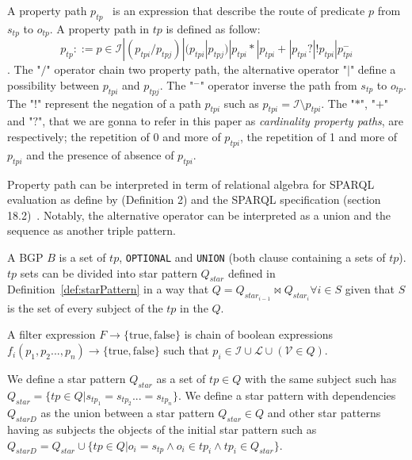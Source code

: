 \begin{definition}\label{def:propertyPath}
   A property path $p_{tp}$~\cite{Kostylev2015} is an expression that describe the route of predicate $p$ from $s_{tp}$ to $o_{tp}$.
   A property path in $tp$ is defined as follow:
   \begin{equation}
    p_{tp} ::= p \in \mathcal{I} | (p_{tpi}/p_{tpj}) | (p_{tpi}|p_{tpj}) | p_{tpi}* | p_{tpi}+ | p_{tpi}? | !p_{tpi}| p_{tpi}^{-}
   \end{equation}.
   The "$/$" operator chain two property path, the alternative operator "$|$" define a possibility between $p_{tpi}$ and $p_{tpj}$.
   The "$^-$" operator inverse the path from $s_{tp}$ to $o_{tp}$.
   The "$!$" represent the negation of a path $p_{tpi}$ such as $p_{tpi} = \mathcal{I} \setminus p_{tpi}$.
   The "$*$", "$+$" and "$?$", that we are gonna to refer in this paper as \emph{cardinality property paths}, are respectively; the repetition of 0 and more of $p_{tpi}$, 
   the repetition of 1 and more of $p_{tpi}$ and the presence of absence of $p_{tpi}$.
\end{definition}

Property path can be interpreted in term of relational algebra for SPARQL evaluation as define by \citeauthor{Kostylev2015} (Definition 2) and the SPARQL specification (section 18.2)~.
Notably, the alternative operator can be interpreted as a union and the sequence as another triple pattern.

\begin{definition}[BGP]\label{def:bgp}
 A BGP $B$ is a set of $tp$, \texttt{OPTIONAL} and \texttt{UNION} (both clause containing a sets of $tp$).
 $tp$ sets can be divided into star pattern $Q_{star}$ defined in Definition~\ref{def:starPattern} in a way 
 that $Q = Q_{star_{i-1}} \bowtie Q_{star_i} \forall i \in S$ given that $S$ is the set of every subject of the $tp$ in the $Q$.
\end{definition}

\begin{definition}\label{def:filterExpression}
    A filter expression $F \rightarrow \{\mathrm{true}, \mathrm{false}\}$ is chain of boolean expressions $f_i(p_1, p_2...,p_n) \rightarrow \{\mathrm{true}, \mathrm{false}\}$ such that 
    $p_i \in \mathcal{I} \cup \mathcal{L} \cup (\mathcal{V}\in Q)$.
\end{definition}

\begin{definition}\label{def:starPattern}
We define a star pattern $Q_{star}$ as a set of $tp \in Q$ with the same subject such has $Q_{star} = \{ tp\in Q| s_{tp_1} = s_{tp_2} ... = s_{tp_n}\}$.
We define a star pattern with dependencies $Q_{starD}$ as the union between a star pattern $Q_{star} \in Q$ and other star patterns having as subjects
the objects of the initial star pattern such as $Q_{starD} = Q_{star} \cup \{tp \in Q| o_{i} = s_{tp} \land o_{i}\in tp_i \land tp_i  \in Q_{star}\}$.
\end{definition}

